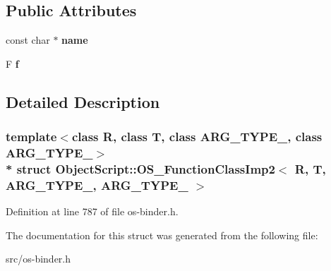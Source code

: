 \subsection*{Public Attributes}
\begin{DoxyCompactItemize}
\item 
const char $\ast$ {\bfseries name}\hypertarget{struct_object_script_1_1_o_s___function_class_imp2_af6da0e73e42d628c83ac4495caef37cb}{}\label{struct_object_script_1_1_o_s___function_class_imp2_af6da0e73e42d628c83ac4495caef37cb}

\item 
F {\bfseries f}\hypertarget{struct_object_script_1_1_o_s___function_class_imp2_ac6a220c82c2e493a253f4681a7eacd35}{}\label{struct_object_script_1_1_o_s___function_class_imp2_ac6a220c82c2e493a253f4681a7eacd35}

\end{DoxyCompactItemize}


\subsection{Detailed Description}
\subsubsection*{template$<$class R, class T, class A\+R\+G\+\_\+\+T\+Y\+P\+E\+\_, class A\+R\+G\+\_\+\+T\+Y\+P\+E\+\_$>$\\*
struct Object\+Script\+::\+O\+S\+\_\+\+Function\+Class\+Imp2$<$ R, T, A\+R\+G\+\_\+\+T\+Y\+P\+E\+\_, A\+R\+G\+\_\+\+T\+Y\+P\+E\+\_ $>$}



Definition at line 787 of file os-\/binder.\+h.



The documentation for this struct was generated from the following file\+:\begin{DoxyCompactItemize}
\item 
src/os-\/binder.\+h\end{DoxyCompactItemize}

